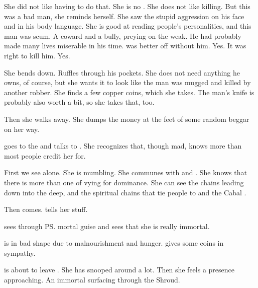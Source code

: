 She did not like having to do that.
She is no \dragon. 
She does not like killing. 
But this was a bad man, she reminds herself. 
She saw the stupid aggression on his face and in his body language. 
She is good at reading people's personalities, and this man was scum. 
A coward and a bully, preying on the weak. 
He had probably made many lives miserable in his time. 
\Miith was better off without him.
Yes. 
It was right to kill him. 
Yes. 

She bends down. 
Ruffles through his pockets. 
She does not need anything he owns, of course, but she wants it to look like the man was mugged and killed by another robber. 
She finds a few copper coins, which she takes. 
The man's knife is probably also worth a bit, so she takes that, too. 

Then she walks away. 
She dumps the money at the feet of some random beggar on her way. 





\begin{comment}
  \section{Visits \Uswa}
\end{comment}
\Criseis{} goes to the  and talks to . 
She recognizes that, though mad, \Uswa{} knows more than most people credit her for. 

First we see \Uswa{} alone. 
She is mumbling. 
She communes with  and . 
She knows that there is more than one  of  vying for dominance. 
She can see the chains leading down into the deep, and the spiritual chains that tie people to \Nyx{} and the Cabal \Matrix. 

Then \Criseis{} comes. 
\Uswa{} tells her stuff. 

\Uswa{} sees through \ps{\Criseis} mortal guise and sees that she is really immortal. 

\Uswa is in bad shape due to malnourishment and hunger.
\Criseis gives \Uswa some coins in sympathy.





\begin{comment}
  \section{Meets \Teshrial}
\end{comment}
\Criseis is about to leave \Malcur. 
She has snooped around a lot. 
Then she feels a presence approaching. 
An immortal surfacing through the Shroud. 

